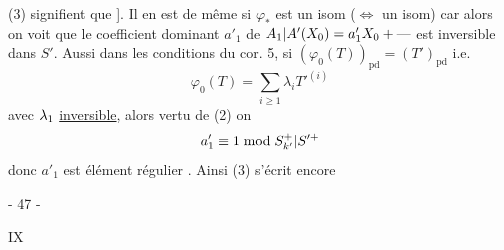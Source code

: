 (3) signifient que
]. Il en est de même si $\varphi_*$ est un isom
($\Leftrightarrow$  un isom) car alors on voit que le coefficient dominant $a'_1$ de ${A_1|A'}(X_0)=a'_1X_0+{\mathbin{\text{---}}}$ est inversible dans $S'$.
Aussi dans les conditions du cor. 5, si $(\varphi_0(T))_{\mathrm{pd}}=(T')_{\mathrm{pd}}$ i.e.
\[
 \varphi_0(T)=\sum_{i\geq1}\lambda_i T'^{(i)}
\]
avec ${\lambda_1}$ \uline{inversible}, alors  vertu de (2) on 
\[
 a'_1\equiv1\bmod{S_{k'}^+|S'^+}
\]
donc $a'_1$ est élément régulier .
Ainsi (3) s'écrit encore

\begin{center}- 47 -\end{center}\hfill IX

